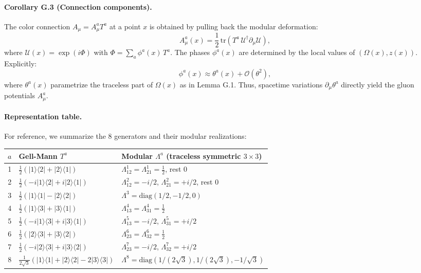\paragraph{Corollary G.3 (Connection components).}
The color connection $A_\mu = A_\mu^a T^a$ at a point $x$ is obtained by pulling back the modular deformation:
\begin{equation}
A_\mu^a(x) = \frac{1}{2}\,\mathrm{tr}(T^a\,\mathcal{U}^\dagger \partial_\mu \mathcal{U}),
\end{equation}
where $\mathcal{U}(x) = \exp(i\Phi)$ with $\Phi = \sum_a \phi^a(x)\,T^a$. The phases $\phi^a(x)$ are determined by the local values of $(\Omega(x),z(x))$. Explicitly:
\begin{equation}
\phi^a(x) \approx \theta^a(x) + \mathcal{O}(\theta^2),
\end{equation}
where $\theta^a(x)$ parametrize the traceless part of $\Omega(x)$ as in Lemma G.1. Thus, spacetime variations $\partial_\mu \theta^a$ directly yield the gluon potentials $A_\mu^a$.

\paragraph{Representation table.}
For reference, we summarize the 8 generators and their modular realizations:

\begin{center}
\begin{tabular}{c|l|l}
\hline
$a$ & Gell-Mann $T^a$ & Modular $\Lambda^a$ (traceless symmetric $3\times 3$) \\
\hline
1 & $\frac{1}{2}(|1\rangle\langle 2| + |2\rangle\langle 1|)$ & $\Lambda^1_{12}=\Lambda^1_{21}=\frac{1}{2}$, rest 0 \\
2 & $\frac{1}{2}(-i|1\rangle\langle 2| + i|2\rangle\langle 1|)$ & $\Lambda^2_{12}=-i/2$, $\Lambda^2_{21}=+i/2$, rest 0 \\
3 & $\frac{1}{2}(|1\rangle\langle 1| - |2\rangle\langle 2|)$ & $\Lambda^3 = \mathrm{diag}(1/2,-1/2,0)$ \\
4 & $\frac{1}{2}(|1\rangle\langle 3| + |3\rangle\langle 1|)$ & $\Lambda^4_{13}=\Lambda^4_{31}=\frac{1}{2}$ \\
5 & $\frac{1}{2}(-i|1\rangle\langle 3| + i|3\rangle\langle 1|)$ & $\Lambda^5_{13}=-i/2$, $\Lambda^5_{31}=+i/2$ \\
6 & $\frac{1}{2}(|2\rangle\langle 3| + |3\rangle\langle 2|)$ & $\Lambda^6_{23}=\Lambda^6_{32}=\frac{1}{2}$ \\
7 & $\frac{1}{2}(-i|2\rangle\langle 3| + i|3\rangle\langle 2|)$ & $\Lambda^7_{23}=-i/2$, $\Lambda^7_{32}=+i/2$ \\
8 & $\frac{1}{2\sqrt{3}}(|1\rangle\langle 1| + |2\rangle\langle 2| - 2|3\rangle\langle 3|)$ & $\Lambda^8 = \mathrm{diag}(1/(2\sqrt{3}),1/(2\sqrt{3}),-1/\sqrt{3})$ \\
\hline
\end{tabular}
\end{center}

